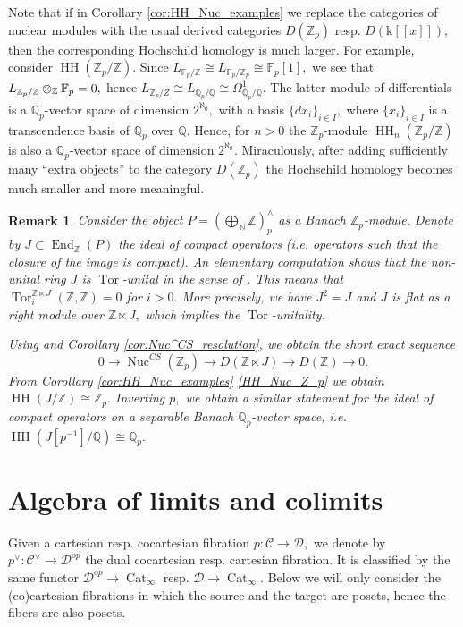 \documentclass[11pt,leqno]{amsart}
\newtheorem{remark}[theo]{Remark}
\numberwithin{equation}{section}
\def\N{\mathbb{N}}
\def\Z{\mathbb{Z}}
\def\Q{\mathbb{Q}}
\def\FF{{\mathbb F}}
\def\End{\operatorname{End}}
\newcommand{\tens}[1]{%
  \mathbin{\mathop{\otimes}\displaylimits_{#1}}%
}
\newcommand{\biggplus}[1][]{\mathop{\bigoplus}\limits_{#1}}
\newcommand{\Nuc}{\operatorname{Nuc}}
\newcommand{\Cat}{\operatorname{Cat}}
\newcommand{\mk}{\mathrm k}
\newcommand{\cD}{{\mathcal D}}
\newcommand{\cC}{{\mathcal C}}
\newcommand{\HH}{\operatorname{HH}}
\newcommand{\Tor}{\operatorname{Tor}}
\begin{document}
Note that if in Corollary \ref{cor:HH_Nuc_examples} we replace the categories of nuclear modules with the usual derived categories $D(\Z_p)$ resp. $D(\mk[[x]]),$ then the corresponding Hochschild homology is much larger. For example, consider $\HH(\Z_p/\Z).$ Since $L_{\FF_p/\Z}\cong L_{\FF_p/\Z_p}\cong \FF_p[1],$ we see that $L_{\Z_p/\Z}\tens{\Z}\FF_p=0,$ hence  $L_{\Z_p/Z}\cong L_{\Q_p/\Q}\cong\Omega^1_{\Q_p/\Q}.$ The latter module of differentials is a $\Q_p$-vector space of dimension $2^{\aleph_0},$ with a basis $\{dx_i\}_{i\in I},$ where $\{x_i\}_{i\in I}$ is a transcendence basis of $\Q_p$ over $\Q.$ Hence, for $n>0$ the $\Z_p$-module $\HH_n(\Z_p/\Z)$ is also a $\Q_p$-vector space of dimension $2^{\aleph_0}.$ Miraculously, after adding sufficiently many ``extra objects'' to the category $D(\Z_p)$ the Hochschild homology becomes much smaller and more meaningful. 

\begin{remark}
Consider the object $P=(\biggplus[\N]\Z)^{\wedge}_p$ as a Banach $\Z_p$-module. Denote by $J\subset \End_{\Z}(P)$ the ideal of compact operators (i.e. operators such that the closure of the image is compact). An elementary computation shows that the non-unital ring $J$ is $\Tor$-unital in the sense of \cite{Sus95}. This means that $\Tor_i^{\Z\ltimes J}(\Z,\Z)=0$ for $i>0.$ More precisely, we have $J^2=J$ and $J$ is flat as a right module over $\Z\ltimes J,$ which implies the $\Tor$-unitality.

Using \cite[Theorem 26]{Tam} and Corollary \ref{cor:Nuc^CS_resolution}, we obtain the short exact sequence
\begin{equation*}
0\to\Nuc^{CS}(\Z_p)\to D(\Z\ltimes J)\to D(\Z)\to 0.
\end{equation*}
From Corollary \ref{cor:HH_Nuc_examples} \ref{HH_Nuc_Z_p} we obtain $\HH(J/\Z)\cong\Z_p.$ Inverting $p,$ we obtain a similar statement for the ideal of compact operators on a separable Banach $\Q_p$-vector space, i.e. $\HH(J[p^{-1}]/\Q)\cong \Q_p.$
\end{remark}

\appendix

\section{Algebra of limits and colimits}
\label{app:limits_colimits}

Given a cartesian resp. cocartesian fibration $p:\cC\to\cD,$ we denote by $p^{\vee}:\cC^{\vee}\to\cD^{op}$ the dual cocartesian resp. cartesian fibration. It is classified by the same functor $\cD^{op}\to\Cat_{\infty}$ resp. $\cD\to\Cat_{\infty}.$ Below we will only consider the (co)cartesian fibrations in which the source and the target are posets, hence the fibers are also posets.
\end{document}
